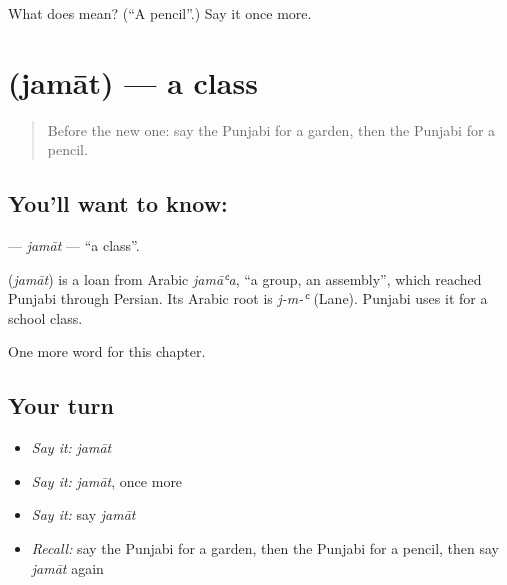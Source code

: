 \begin{tcolorbox}[breakable,colback=teal!4,colframe=teal!35!black,title={Before you move on}]
What does  mean? (\textquotedblleft{}A pencil\textquotedblright{}.) Say it once more.
\end{tcolorbox}
\section[\texorpdfstring{\pa{ਜਮਾਤ} (jamāt)}{ਜਮਾਤ (jamāt)}]{ (jamāt) — a class}

\label{lesson:PA-C138-jamat}



\begin{quote}
Before the new one: say the Punjabi for a garden, then the Punjabi for a pencil.
\end{quote}

\subsection*{You'll want to know: }
\textbf{} — \emph{jamāt} — \textquotedblleft{}a class\textquotedblright{}.

\begin{cousinweb}
\textbf{} (\emph{jamāt}) is a loan from Arabic \emph{jamāʿa}, \textquotedblleft{}a group, an assembly\textquotedblright{}, which reached Punjabi through Persian. Its Arabic root is \emph{j-m-ʿ} (Lane). Punjabi uses it for a school class.
\end{cousinweb}

\begin{grammarlens}[title={What you've built}]
One more word for this chapter.
\end{grammarlens}

\subsection*{Your turn}
\begin{itemize}
\raggedright
  \item \emph{Say it:} \emph{jamāt}
  \item \emph{Say it:} \emph{jamāt}, once more
  \item \emph{Say it:} say \emph{jamāt}
  \item \emph{Recall:} say the Punjabi for a garden, then the Punjabi for a pencil, then say \emph{jamāt} again
\end{itemize}

